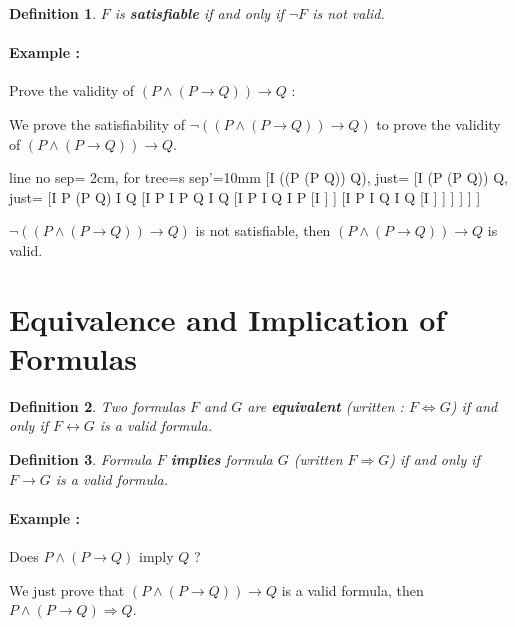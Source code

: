 \documentclass[a4paper,11pt]{report}
\newtheorem*{mydef}{Definition}
\begin{document}
\begin{mydef}
  $F$ is \textbf{satisfiable} if and only if $\neg F$ is not valid.
\end{mydef}

\paragraph{Example :} Prove the validity of $(P \wedge (P \to Q)) \to Q$ :

We prove the satisfiability of $\neg((P \wedge (P \to Q)) \to Q)$ to prove the
validity of $(P \wedge (P \to Q)) \to Q$.

\begin{tableau}
  {
    line no sep= 2cm,
    for tree={s sep'=10mm}
  }
  [I \models \neg((P \wedge (P \to Q)) \to Q), just={}
  [I \not \models (P \wedge (P \to Q)) \to Q, just={}
  [I \models P \wedge (P \to Q)  I \not \models Q
  [I \models P  I \models P \to Q  I \not \models Q
  [I \models P  I \not \models Q  I \not \models P
  [I \models \bot]
  ]
  [I \models P  I \not \models Q  I \models Q
  [I \models \bot]
  ]  ]  ]  ]  ]
\end{tableau}

$\neg((P \wedge (P \to Q)) \to Q)$ is not satisfiable, then $(P \wedge (P \to
Q)) \to Q$ is valid.

\section{Equivalence and Implication of Formulas}

\begin{mydef}
  Two formulas $F$ and $G$ are \textbf{equivalent} (written : $F \Leftrightarrow G$) if
  and only if $F \leftrightarrow G$ is a valid formula.
\end{mydef}

\begin{mydef}
  Formula $F$ \textbf{implies} formula $G$ (written $F \Rightarrow G$) if and
  only if $F \to G$ is a valid formula.
\end{mydef}

\paragraph{Example :} Does $P \wedge (P \to Q)$ imply $Q$ ?

We just prove that $(P \wedge (P \to Q)) \to Q$ is a valid formula, then $P
\wedge (P \to Q) \Rightarrow Q$.
\end{document}
